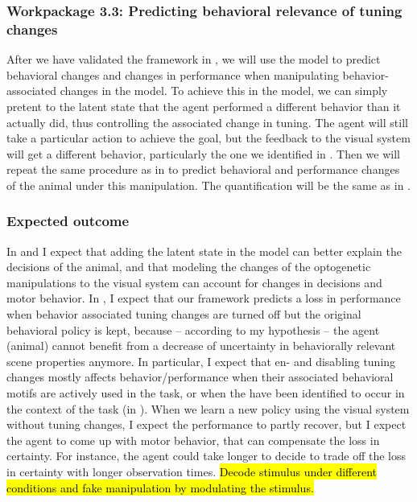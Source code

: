 \documentclass[B2,COG]{ercgrant}
\begin{document}
\subsubsection{Workpackage 3.3: Predicting behavioral relevance of tuning changes\hfill{}}

After we have validated the framework in , we will use the model to predict behavioral changes and changes in performance when manipulating behavior-associated changes in the model. 
To achieve this in the model, we can simply pretent to the latent state that the agent performed a different behavior than it actually did, thus controlling the associated change in tuning. 
The agent will still take a particular action to achieve the goal, but the feedback to the visual system will get a different behavior, particularly the one we identified in .
Then we will repeat the same procedure as in  to predict behavioral and performance changes of the animal under this manipulation. 
The quantification will be the same as in .

\subsubsection{Expected outcome} 
In  and  I expect that adding the latent state in the model can better explain the decisions of the animal, and that modeling the changes of the optogenetic manipulations to the visual system can account for changes in decisions and motor behavior. 
In , I expect that our framework predicts a loss in performance when behavior associated tuning changes are turned off but the original behavioral policy is kept, because -- according to my hypothesis -- the agent (animal) cannot benefit from a decrease of uncertainty in behaviorally relevant scene properties anymore. 
In particular, I expect that en- and disabling tuning changes mostly affects behavior/performance when their associated behavioral motifs are actively used in the task, or when the have been identified to occur in the context of the task (in ).
When we learn a new policy using the visual system without tuning changes, I expect the performance to partly recover, but I expect the agent to come up with motor behavior, that can compensate the loss in certainty. 
For instance, the agent could take longer to decide to trade off the loss in certainty with longer observation times. 
\hl{Decode stimulus under different conditions and fake manipulation by modulating the stimulus.}
\end{document}
